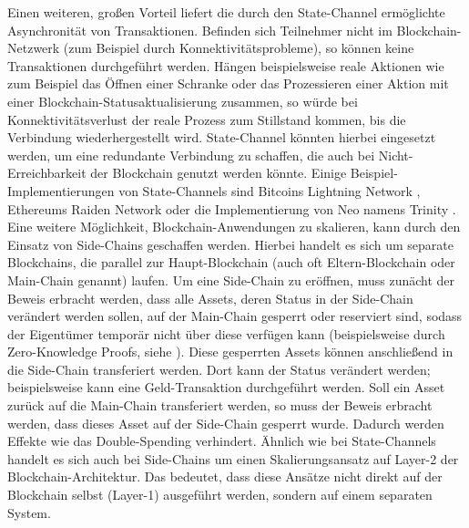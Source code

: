 Einen weiteren, großen Vorteil liefert die durch den State-Channel ermöglichte Asynchronität von Transaktionen. Befinden sich Teilnehmer nicht im Blockchain-Netzwerk (zum Beispiel durch Konnektivitätsprobleme), so können keine Transaktionen durchgeführt werden. Hängen beispielsweise reale Aktionen wie zum Beispiel das Öffnen einer Schranke oder das Prozessieren einer Aktion mit einer Blockchain-Statusaktualisierung zusammen, so würde bei Konnektivitätsverlust der reale Prozess zum Stillstand kommen, bis die Verbindung wiederhergestellt wird. State-Channel könnten hierbei eingesetzt werden, um eine redundante Verbindung zu schaffen, die auch bei Nicht-Erreichbarkeit der Blockchain genutzt werden könnte. Einige Beispiel-Implementierungen von State-Channels sind Bitcoins Lightning Network \cite{Lightning2016}, Ethereums Raiden Network oder die Implementierung von Neo namens Trinity \cite{Trinity2018}.\\
Eine weitere Möglichkeit, Blockchain-Anwendungen zu skalieren, kann durch den Einsatz von Side-Chains \cite{sidechain2019} geschaffen werden. Hierbei handelt es sich um separate Blockchains, die parallel zur Haupt-Blockchain (auch oft Eltern-Blockchain oder Main-Chain genannt) laufen. Um eine Side-Chain zu eröffnen, muss zunächt der Beweis erbracht werden, dass alle Assets, deren Status in der Side-Chain verändert werden sollen, auf der Main-Chain gesperrt oder reserviert sind, sodass der Eigentümer temporär nicht über diese verfügen kann (beispielsweise durch Zero-Knowledge Proofs, siehe \cite{zeroknowledge2020}). Diese gesperrten Assets können anschließend in die Side-Chain transferiert werden. Dort kann der Status verändert werden; beispielsweise kann eine Geld-Transaktion durchgeführt werden. Soll ein Asset zurück auf die Main-Chain transferiert werden, so muss der Beweis erbracht werden, dass dieses Asset auf der Side-Chain gesperrt wurde. Dadurch werden Effekte wie das Double-Spending verhindert. Ähnlich wie bei State-Channels handelt es sich auch bei Side-Chains um einen Skalierungsansatz auf Layer-2 der Blockchain-Architektur. Das bedeutet, dass diese Ansätze nicht direkt auf der Blockchain selbst (Layer-1) ausgeführt werden, sondern auf einem separaten System.


